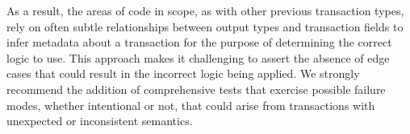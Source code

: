 \documentclass{article}
\begin{document}
As a result, the areas of code in scope, as with other previous transaction types, rely on often subtle relationships between output types and transaction fields to infer metadata about a transaction for the purpose of determining the correct logic to use.
This approach makes it challenging to assert the absence of edge cases that could result in the incorrect logic being applied.
We strongly recommend the addition of comprehensive tests that exercise possible failure modes, whether intentional or not, that could arise from transactions with unexpected or inconsistent semantics.
\end{document}
